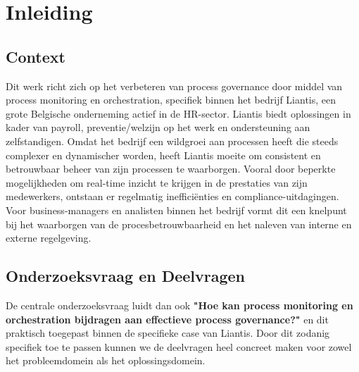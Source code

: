 
\section{Inleiding}%
\label{sec:inleiding}

\subsection{Context}

Dit werk richt zich op het verbeteren van process governance door middel van process monitoring en orchestration, specifiek binnen het bedrijf Liantis, een grote Belgische onderneming actief in de HR-sector. Liantis biedt oplossingen in kader van payroll, preventie/welzijn op het werk en ondersteuning aan zelfstandigen. Omdat het bedrijf een wildgroei aan processen heeft die steeds complexer en dynamischer worden, heeft Liantis moeite om consistent en betrouwbaar beheer van zijn processen te waarborgen. Vooral door beperkte mogelijkheden om real-time inzicht te krijgen in de prestaties van zijn medewerkers, ontstaan er regelmatig inefficiënties en compliance-uitdagingen. Voor business-managers en analisten binnen het bedrijf vormt dit een knelpunt bij het waarborgen van de procesbetrouwbaarheid en het naleven van interne en externe regelgeving. 

\subsection{Onderzoeksvraag en Deelvragen}
De centrale onderzoeksvraag luidt dan ook \textbf{"Hoe kan process monitoring en orchestration bijdragen aan effectieve process governance?"} en dit praktisch toegepast binnen de specifieke case van Liantis. Door dit zodanig specifiek toe te passen kunnen we de deelvragen heel concreet maken voor zowel het probleemdomein als het oplossingsdomein.

